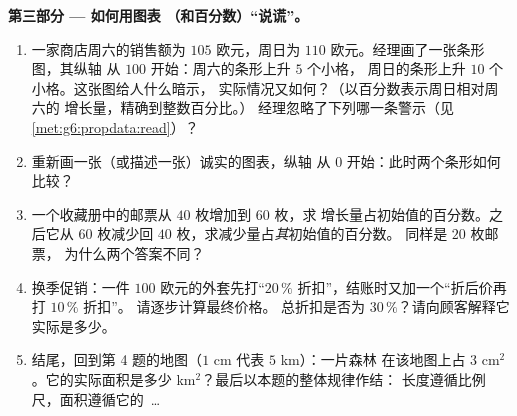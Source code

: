 \begin{problem}
\medskip
\noindent\textbf{第三部分 --- 如何用图表
（和百分数）“说谎”。}
\begin{enumerate}[resume]
  \item 一家商店周六的销售额为 $105$ 欧元，周日为 $110$
        欧元。经理画了一张条形图，其纵轴
        从 $100$ 开始：周六的条形上升 $5$ 个小格，
        周日的条形上升 $10$ 个小格。这张图给人什么暗示，
        实际情况又如何？（以百分数表示周日相对周六的
        增长量，精确到整数百分比。）
        经理忽略了下列哪一条警示（见
        \cref{met:g6:propdata:read}）？
  \item 重新画一张（或描述一张）诚实的图表，纵轴
        从 $0$ 开始：此时两个条形如何比较？
  \item 一个收藏册中的邮票从 $40$ 枚增加到 $60$ 枚，求
        增长量占初始值的百分数。之后它从 $60$ 枚减少回
        $40$ 枚，求减少量占\emph{其}初始值的百分数。
        同样是 $20$ 枚邮票，
        为什么两个答案不同？
  \item 换季促销：一件 $100$ 欧元的外套先打“$20\,\%$
        折扣”，结账时又加一个“折后价再打 $10\,\%$ 折扣”。
        请逐步计算最终价格。
        总折扣是否为 $30\,\%$？请向顾客解释它
        实际是多少。
  \item 结尾，回到第 4 题的地图（$1$ cm 代表 $5$ km）：一片森林
        在该地图上占 $3$ cm$^2$。它的实际面积是多少
        km$^2$？最后以本题的整体规律作结：
        长度遵循比例尺，面积遵循它的
        \,\dots
\end{enumerate}
\end{problem}

